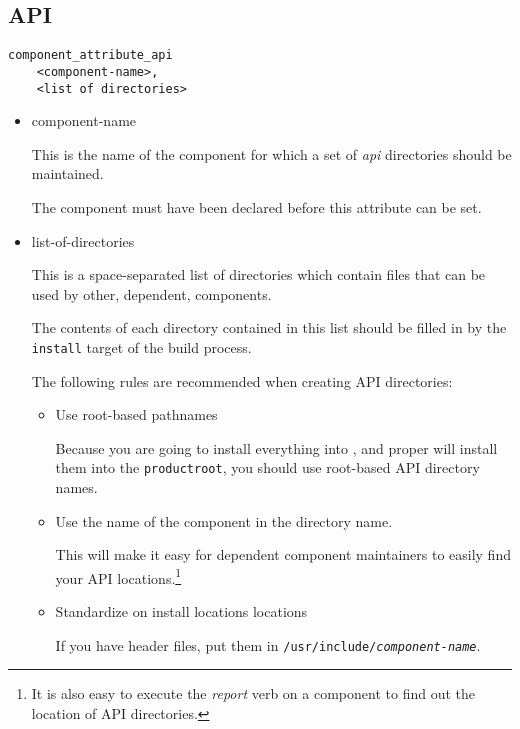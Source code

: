 \subsection{API}

\begin{verbatim}
component_attribute_api
    <component-name>,
    <list of directories>
\end{verbatim}

\begin{itemize}
\item component-name

  This is the name of the component for which a set of \emph{api}
  directories should be maintained.

  The component must have been declared before this attribute can be
  set.

\item list-of-directories

  This is a space-separated list of directories which contain files
  that can be used by other, dependent, components.

  The contents of each directory contained in this list should be
  filled in \destdir by the \texttt{install} target of the build
  process.

  The following rules are recommended when creating API directories:

  \begin{itemize}
    \item Use root-based pathnames

      Because you are going to install everything into \destdir, and
      \lmsbw proper will install them into the
      \texttt{productroot}, you
      should use root-based API directory names.

    \item Use the name of the component in the directory name.

      This will make it easy for dependent component maintainers to
      easily find your API locations.\footnote{It is also easy to
        execute the \emph{report} verb on a component to find out
        the location of API directories.}

    \item Standardize on install locations locations

      If you have header files, put them in
      \texttt{/usr/include/\emph{component-name}}.


\end{itemize}
\end{itemize}
